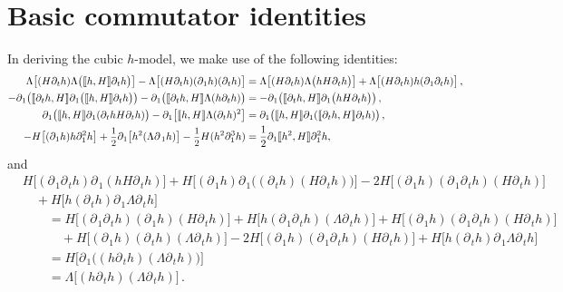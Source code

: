 \documentclass[11pt]{article}
\theoremstyle{plain}
\theoremstyle{definition}
\theoremstyle{definition}
\def\p{\text{\bf\emph{p}}}
\def\p{{\partial\hspace{1pt}}}
\def\comm#1#2{{\llbracket#1,#2\rrbracket}}
\def\smallexp#1{{\text{\small #1}}}
\def\dfrac#1#2{\smallexp{$\displaystyle{}\frac{#1}{#2}$}}
\begin{document}
\section{Basic commutator identities}\label{appendix1}
In deriving the cubic $h$-model, we make use of the following identities:
\begin{align*}
\Lambda\big[(H \p_{\!t} h) \Lambda \big(\comm{h}{H} \p_{\!t} h\big)\big] - \Lambda \big[(H \p_{\!t} h) (\p_{\!1} h) (\p_{\!t} h)\big]
&=\Lambda\big[(H \p_{\!t} h) \Lambda \big(h H \p_{\!t} h\big)\big] + \Lambda \big[(H \p_{\!t} h)  h (\p_{\!1}\p_{\!t} h)\big] \,, \\
- \p_{\!1} \big(\comm{\p_{\!t} h}{H} \p_{\!1} \big(\comm{h}{H} \p_{\!t} h \big)\big)- \p_{\!1} \big(\comm{\p_{\!t} h}{H} \Lambda (h \p_{\!t} h)\big)
&=- \p_{\!1} \big(\comm{\p_{\!t} h}{H} \p_{\!1} \big(h H \p_{\!t} h \big)\big)\,, \\
\p_{\!1} \big(\comm{h}{H} \p_{\!1} (\p_{\!t} h H \p_{\!t} h) \big)  - \p_{\!1} \big[\comm{h}{H} \Lambda (\p_{\!t} h)^2 \big]
&=\p_{\!1} \big(\comm{h}{H} \p_{\!1} (\comm{\p_{\!t} h}{H} \p_{\!t} h) \big)\,, \\
-H \big[(\p_{\!1} h) h \partial_1^2 h\big]+\dfrac{1}{2} \p_{\!1} \big[h^2 (\Lambda \p_{1} h)\big]  - \dfrac{1}{2} H (h^2 \partial_1^3h)&=\frac{1}{2}\partial_1\comm{h^2}{H}\partial_1^2h,
\end{align*}
and
\begin{align*}
& H \big[(\p_{\!1} \p_{\!t} h) \p_{\!1}(h H \p_{\!t} h)\big] + H \big[(\p_{\!1} h) \p_{\!1}\big((\p_{\!t} h) (H \p_{\!t} h)\big)\big] - 2 H \big[(\p_{\!1}h) (\p_{\!1} \p_{\!t} h) (H \p_{\!t} h)\big] \\
&\quad + H \big[h (\p_{\!t} h) \p_{\!1} \Lambda \p_{\!t} h\big] \\
&\qquad = H \big[(\p_{\!1} \p_{\!t} h) (\p_{\!1} h) (H \p_{\!t} h)\big] + H \big[h (\p_{\!1} \p_{\!t} h) (\Lambda \p_{\!t} h)\big] + H \big[(\p_{\!1} h) (\p_{\!1} \p_{\!t} h) (H \p_{\!t} h)\big] \\
&\qquad\quad + H \big[(\p_{\!1} h) (\p_{\!t} h) (\Lambda \p_{\!t} h)\big] - 2 H \big[(\p_{\!1}h) (\p_{\!1} \p_{\!t} h) (H \p_{\!t} h)\big] + H \big[h (\p_{\!t} h) \p_{\!1} \Lambda \p_{\!t} h\big] \\
&\qquad = H \big[\p_{\!1} \big((h \p_{\!t} h) (\Lambda \p_{\!t} h) \big)\big] \\
&\qquad = \Lambda \big[(h \p_{\!t} h) (\Lambda \p_{\!t}h)\big]\,.
\end{align*}
\end{document}
